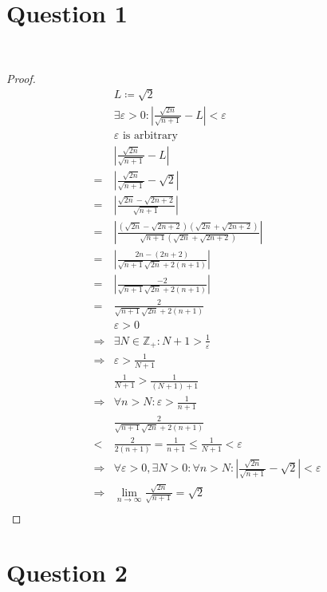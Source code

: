\documentclass{article}
\begin{document}
\section*{Question 1}

~

\begin{proof}
    \begin{align*}
        &L\coloneqq \sqrt{2}\\
        &\exists\varepsilon>0:\left|\frac{\sqrt{2n}}{\sqrt{n+1}}-L \right|<\varepsilon\\
        &\varepsilon\text{ is arbitrary}\\
        &\left|\frac{\sqrt{2n}}{\sqrt{n+1}}-L \right|\\
        =&\left|\frac{\sqrt{2n}}{\sqrt{n+1}}-\sqrt{2}\right|\\
        =&\left|\frac{\sqrt{2n}-\sqrt{2n+2}}{\sqrt{n+1}}\right|\\
        =&\left|\frac{(\sqrt{2n}-\sqrt{2n+2})(\sqrt{2n}+\sqrt{2n+2})}{\sqrt{n+1}(\sqrt{2n}+\sqrt{2n+2})}\right|\\
        =&\left|\frac{2n-(2n+2)}{\sqrt{n+1}\sqrt{2n}+2(n+1)}\right|\\
        =&\left|\frac{-2}{\sqrt{n+1}\sqrt{2n}+2(n+1)}\right|\\
        =&\frac{2}{\sqrt{n+1}\sqrt{2n}+2(n+1)}\\
        &\varepsilon>0\\
        \Rightarrow&\exists N\in\mathbb{Z} _+:N+1>\frac{1}{\varepsilon}\\
        \Rightarrow&\varepsilon>\frac{1}{N+1}\\
        &\frac{1}{N+1}>\frac{1}{(N+1)+1}\\
        \Rightarrow&\forall n>N:\varepsilon>\frac{1}{n+1}\\
        &\frac{2}{\sqrt{n+1}\sqrt{2n}+2(n+1)}\\
        <&\frac{2}{2(n+1)}=\frac{1}{n+1}\leqslant\frac{1}{N+1}<\varepsilon\\
        \Rightarrow&\forall\varepsilon>0,\exists N>0:\forall n>N:\left|\frac{\sqrt{2n}}{\sqrt{n+1}}-\sqrt{2} \right|<\varepsilon\\
        \Rightarrow&\lim_{n\to\infty}\frac{\sqrt{2n}}{\sqrt{n+1}}=\sqrt{2}\\
    \end{align*}
\end{proof}

\newpage

\section*{Question 2}
\end{document}
